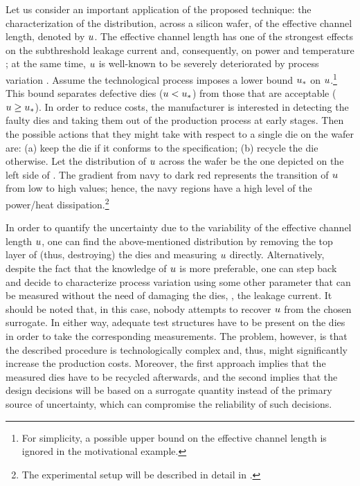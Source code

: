 
Let us consider an important application of the proposed technique: the characterization of the distribution, across a silicon wafer, of the effective channel length, denoted by $u$. The effective channel length has one of the strongest effects on the subthreshold leakage current and, consequently, on power and temperature \cite{juan2011, juan2012}; at the same time, $u$ is well-known to be severely deteriorated by process variation \cite{chandrakasan2001, srivastava2010}.
Assume the technological process imposes a lower bound $u_*$ on $u$.\footnote{For simplicity, a possible upper bound on the effective channel length is ignored in the motivational example.} This bound separates defective dies ($u < u_*$) from those that are acceptable ($u \geq u_*$).
In order to reduce costs, the manufacturer is interested in detecting the faulty dies and taking them out of the production process at early stages.
Then the possible actions that they might take with respect to a single die on the wafer are: (a) keep the die if it conforms to the specification; (b) recycle the die otherwise.
Let the distribution of $u$ across the wafer be the one depicted on the left side of .
The gradient from navy to dark red represents the transition of $u$ from low to high values; hence, the navy regions have a high level of the power/heat dissipation.\footnote{The experimental setup will be described in detail in .}

In order to quantify the uncertainty due to the variability of the effective channel length $u$, one can find the above-mentioned distribution by removing the top layer of (thus, destroying) the dies and measuring $u$ directly.
Alternatively, despite the fact that the knowledge of $u$ is more preferable, one can step back and decide to characterize process variation using some other parameter that can be measured without the need of damaging the dies, \eg, the leakage current.
It should be noted that, in this case, nobody attempts to recover $u$ from the chosen surrogate.
In either way, adequate test structures have to be present on the dies in order to take the corresponding measurements.
The problem, however, is that the described procedure is technologically complex and, thus, might significantly increase the production costs.
Moreover, the first approach implies that the measured dies have to be recycled afterwards, and the second implies that the design decisions will be based on a surrogate quantity instead of the primary source of uncertainty, which can compromise the reliability of such decisions.

